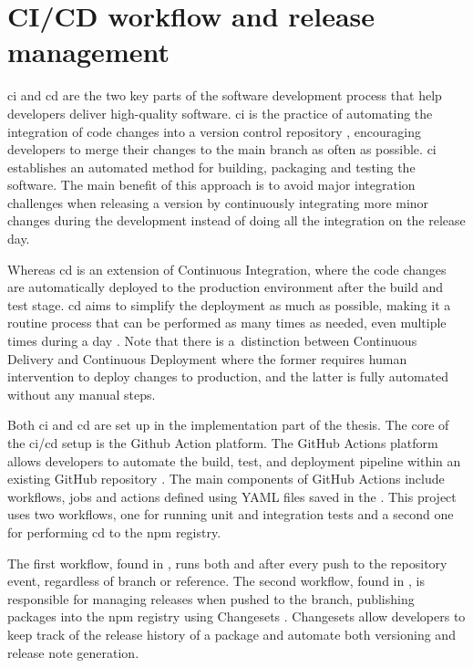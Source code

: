 \section{CI/CD workflow and release management}

\acrlong{ci} and \acrlong{cd} are the two key parts of the software development process that help developers deliver high-quality software. \acrfull{ci} is the practice of automating the integration of code changes into a version control repository \cite{atlassianContinuousIntegrationVs}, encouraging developers to merge their changes to the main branch as often as possible. \acrshort{ci} establishes an automated method for building, packaging and testing the software. The main benefit of this approach is to avoid major integration challenges when releasing a version by continuously integrating more minor changes during the development instead of doing all the integration on the release day.

Whereas \acrfull{cd} is an extension of Continuous Integration, where the code changes are automatically deployed to the production environment after the build and test stage. \acrshort{cd} aims to simplify the deployment as much as possible, making it a routine process that can be performed as many times as needed, even multiple times during a day \cite{WhatCICD}. Note that there is a~distinction between Continuous Delivery and Continuous Deployment where the former requires human intervention to deploy changes to production, and the latter is fully automated without any manual steps.

Both \acrlong{ci} and \acrlong{cd} are set up in the implementation part of the thesis. The core of the \acrshort{ci}/\acrshort{cd} setup is the Github Action platform. The GitHub Actions platform allows developers to automate the build, test, and deployment pipeline within an existing GitHub repository \cite{UnderstandingGitHubActions}. The main components of GitHub Actions include workflows, jobs and actions defined using YAML files saved in the . This project uses two workflows, one for running unit and integration tests and a second one for performing \acrlong{cd} to the \acrshort{npm} registry.

The first workflow, found in , runs both  and  after every push to the repository event, regardless of branch or reference. The second workflow, found in , is responsible for managing releases when pushed to the  branch, publishing packages into the \acrshort{npm} registry using Changesets \cite{ChangesetsChangesets2023}. Changesets allow developers to keep track of the release history of a package and automate both versioning and release note generation.


